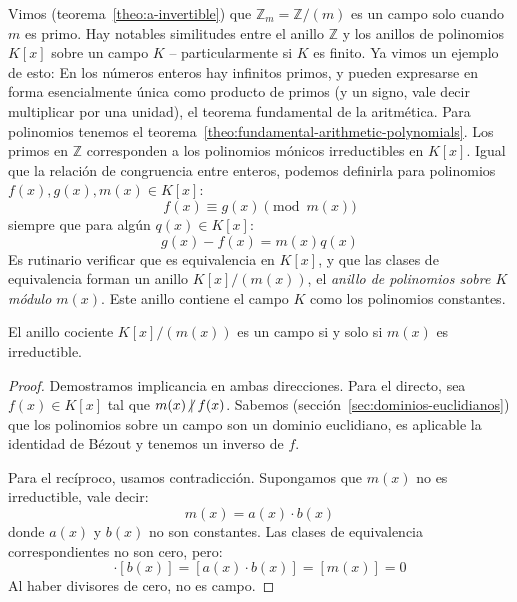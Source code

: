   Vimos
  (teorema~\ref{theo:a-invertible})
  que \(\mathbb{Z}_m = \mathbb{Z} / (m)\)
  es un campo solo cuando \(m\) es primo.
  Hay notables similitudes entre el anillo \(\mathbb{Z}\)
  y los anillos de polinomios \(K[x]\) sobre un campo \(K\)%
  -- particularmente si \(K\) es finito.
  Ya vimos un ejemplo de esto:
  En los números enteros
  hay infinitos primos,
  y pueden expresarse en forma esencialmente única
  como producto de primos
  (y un signo,
   vale decir multiplicar por una unidad),
  el teorema fundamental de la aritmética.%
  Para polinomios
  tenemos el teorema~\ref{theo:fundamental-arithmetic-polynomials}.%
  Los primos en \(\mathbb{Z}\)
  corresponden a los polinomios mónicos irreductibles en \(K[x]\).
  Igual que la relación de congruencia entre enteros,%
  podemos definirla para polinomios
  \(f(x), g(x), m(x) \in K[x]\):
  \begin{equation*}
    f(x)
      \equiv g(x) \pmod{m(x)}
  \end{equation*}
  siempre que para algún \(q(x) \in K[x]\):
  \begin{equation*}
    g(x) - f(x)
      = m(x) q(x)
  \end{equation*}
  Es rutinario verificar que es equivalencia en \(K[x]\),
  y que las clases de equivalencia
  forman un anillo \(K[x] / (m(x))\),
  el \emph{anillo de polinomios sobre \(K\) módulo \(m(x)\)}.
  Este anillo contiene el campo \(K\)
  como los polinomios constantes.
  \begin{theorem}
    \label{theo:polynomial-ring-modulo-m=field}
    El anillo cociente \(K[x] / (m(x))\)
    es un campo si y solo si \(m(x)\) es irreductible.
  \end{theorem}
  \begin{proof}
    Demostramos implicancia en ambas direcciones.
    Para el directo,
    sea \(f(x) \in K[x]\) tal que \(m(x) \centernot\mid f(x)\).
    Sabemos
    (sección~\ref{sec:dominios-euclidianos})%
    que los polinomios sobre un campo son un dominio euclidiano,
    es aplicable la identidad de Bézout
    y tenemos un inverso de \(f\).%

    Para el recíproco,
    usamos contradicción.%
    Supongamos que \(m(x)\) no es irreductible,
    vale decir:
    \begin{equation*}
      m(x)
	= a(x) \cdot b(x)
    \end{equation*}
    donde \(a(x)\) y \(b(x)\) no son constantes.
    Las clases de equivalencia correspondientes no son cero,
    pero:
    \begin{equation*}
      [a(z)] \cdot [b(x)]
	= [a(x) \cdot b(x)]
	= [m(x)]
	= 0
    \end{equation*}
    Al haber divisores de cero,
    no es campo.
  \end{proof}
